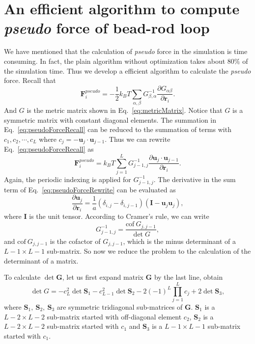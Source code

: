
\chapter{An efficient algorithm to compute \emph{pseudo} force of bead-rod loop} 
\label{append:algorithm_bead_rod}

We have mentioned that the calculation of \emph{pseudo} force in the simulation is time consuming. In fact, the plain algorithm without optimization takes about $80\%$ of the simulation time. Thus we develop a efficient algorithm to calculate the \emph{pseudo} force. Recall that
\begin{equation}
    \label{eq:pseudoForceRecall}
    \mathbf{F}_i^{pseudo} = -\frac{1}{2} k_B T \sum_{\alpha, \beta} G_{\beta, \alpha}^{-1} \frac{\partial G_{\alpha\beta}}{\partial \mathbf{r}_i}.
\end{equation}
And $G$ is the metric matrix shown in Eq.~\eqref{eq:metricMatrix}. Notice that $G$ is a symmetric matrix with constant diagonal elements. 
The summation in Eq.~\eqref{eq:pseudoForceRecall} can be reduced to the summation of terms with $c_1, c_2, \cdots, c_L$ where $c_j = -\mathbf{u}_j \cdot \mathbf{u}_{j-1}$. Thus we can rewrite Eq.~\eqref{eq:pseudoForceRecall} as
\begin{equation}
    \label{eq:pseudoForceRewrite}
    \mathbf{F}_i^{pseudo} =  k_B T \sum_{j=1}^L G_{j-1,j}^{-1} \frac{\partial \mathbf{u}_{j}\cdot\mathbf{u}_{j-1}}{\partial \mathbf{r}_i}.
\end{equation}
Again, the periodic indexing is applied for $G_{j-1,j}^{-1}$. The derivative in the sum term of Eq.~\eqref{eq:pseudoForceRewrite} can be evaluated as 
\begin{equation}
    \frac{\partial \mathbf{u}_j }{\partial \mathbf{r}_i} = \frac{1}{a} (\delta_{i,j} - \delta_{i,j-1})(\mathbf{I} - \mathbf{u}_j\mathbf{u}_j),
\end{equation}
where $\mathbf{I}$ is the unit tensor. According to Cramer's rule, we can write
\begin{equation}
    G_{j-1,j}^{-1} = \frac{\text{cof}~G_{j,j-1}}{\det G},
\end{equation}
and $\text{cof}~G_{j,j-1}$ is the cofactor of $G_{j, j-1}$, which is the minus determinant of a $L-1\times L-1$ sub-matrix. So now we reduce the problem to the calculation of the determinant of a matrix. 

To calculate $\det\mathbf{G}$, let us first expand matrix $\mathbf{G}$ by the last line, obtain
\begin{equation}
    \label{eq:detGexpand}
    \det G = -c_L^2 \det\mathbf{S}_1 - c_{L-1}^2 \det\mathbf{S}_2 - 2(-1)^L\prod_{j=1}^L c_j + 2\det \mathbf{S}_3,
\end{equation}
where $\mathbf{S}_1,~\mathbf{S}_2,~\mathbf{S}_3$ are symmetric tridiagonal sub-matrices of $\mathbf{G}$. $\mathbf{S}_1$ is a $L-2\times L-2$ sub-matrix started with off-diagonal element $c_2$, $\mathbf{S}_2$ is a $L-2\times L-2$ sub-matrix started with $c_1$ and $\mathbf{S}_3$ is a $L-1 \times L-1$ sub-matrix started with $c_1$.


